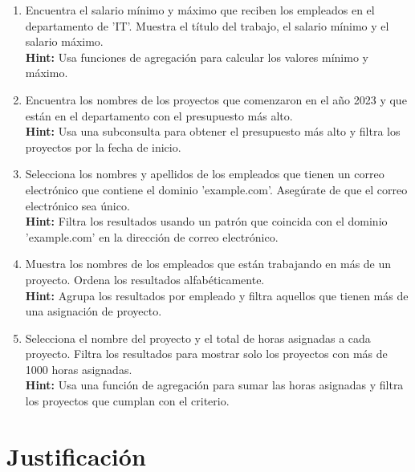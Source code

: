 \begin{enumerate}
    \item Encuentra el salario mínimo y máximo que reciben los empleados en el departamento de 'IT'. Muestra el título del trabajo, el salario mínimo y el salario máximo.
    \\
    \textbf{Hint:} Usa funciones de agregación para calcular los valores mínimo y máximo.

    \item Encuentra los nombres de los proyectos que comenzaron en el año 2023 y que están en el departamento con el presupuesto más alto.
    \\
    \textbf{Hint:} Usa una subconsulta para obtener el presupuesto más alto y filtra los proyectos por la fecha de inicio.

    \item Selecciona los nombres y apellidos de los empleados que tienen un correo electrónico que contiene el dominio 'example.com'. Asegúrate de que el correo electrónico sea único.
    \\
    \textbf{Hint:} Filtra los resultados usando un patrón que coincida con el dominio 'example.com' en la dirección de correo electrónico.

    \item Muestra los nombres de los empleados que están trabajando en más de un proyecto. Ordena los resultados alfabéticamente.
    \\
    \textbf{Hint:} Agrupa los resultados por empleado y filtra aquellos que tienen más de una asignación de proyecto.

    \item Selecciona el nombre del proyecto y el total de horas asignadas a cada proyecto. Filtra los resultados para mostrar solo los proyectos con más de 1000 horas asignadas.
    \\
    \textbf{Hint:} Usa una función de agregación para sumar las horas asignadas y filtra los proyectos que cumplan con el criterio.

\end{enumerate}

\section*{Justificación}

